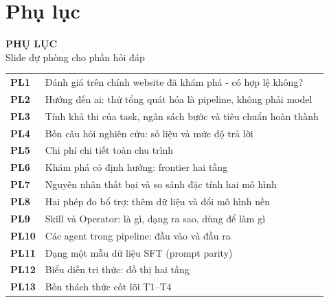 
\section{Phụ lục}

\begin{frame}[plain]
  \centering
  \vfill
  {\Large\textbf{PHỤ LỤC}}\\[0.25cm]
  {\normalsize Slide dự phòng cho phần hỏi đáp}
  \vfill
  \scriptsize
  \begin{tabular}{@{}ll@{}}
    \textbf{PL1} & Đánh giá trên chính website đã khám phá - có hợp lệ không? \\
    \textbf{PL2} & Hướng đến ai: thứ tổng quát hóa là pipeline, không phải model \\
    \textbf{PL3} & Tính khả thi của task, ngân sách bước và tiêu chuẩn hoàn thành \\
    \textbf{PL4} & Bốn câu hỏi nghiên cứu: số liệu và mức độ trả lời \\
    \textbf{PL5} & Chi phí chi tiết toàn chu trình \\
    \textbf{PL6} & Khám phá có định hướng: frontier hai tầng \\
    \textbf{PL7} & Nguyên nhân thất bại và so sánh đặc tính hai mô hình \\
    \textbf{PL8} & Hai phép đo bổ trợ: thêm dữ liệu và đổi mô hình nền \\
    \textbf{PL9} & Skill và Operator: là gì, dạng ra sao, dùng để làm gì \\
    \textbf{PL10} & Các agent trong pipeline: đầu vào và đầu ra \\
    \textbf{PL11} & Dạng một mẫu dữ liệu SFT (prompt parity) \\
    \textbf{PL12} & Biểu diễn tri thức: đồ thị hai tầng \\
    \textbf{PL13} & Bốn thách thức cốt lõi T1--T4 \\
  \end{tabular}
  \vfill
\end{frame}

